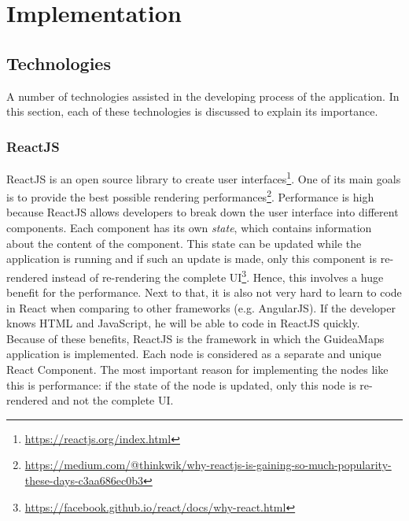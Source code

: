\chapter{Implementation}\label{ch:implementation}

\section{Technologies}\label{sec:technologies}
A number of technologies assisted in the developing process of the application. In this section, each of these technologies is discussed to explain its importance.

\subsection{ReactJS}\label{sec:reactjs}
ReactJS is an open source library to create user interfaces\footnote{\url{https://reactjs.org/index.html}}. One of its main goals is to provide the best possible rendering performances\footnote{\url{https://medium.com/@thinkwik/why-reactjs-is-gaining-so-much-popularity-these-days-c3aa686ec0b3}}. Performance is high because ReactJS allows developers to break down the user interface into different components. Each component has its own \textit{state}, which contains information about the content of the component. This state can be updated while the application is running and if such an update is made, only this component is re-rendered instead of re-rendering the complete UI\footnote{\url{https://facebook.github.io/react/docs/why-react.html}}. Hence, this involves a huge benefit for the performance. Next to that, it is also not very hard to learn to code in React when comparing to other frameworks (e.g. AngularJS). If the developer knows HTML and JavaScript, he will be able to code in ReactJS quickly.\\

Because of these benefits, ReactJS is the framework in which the GuideaMaps application is implemented. Each node is considered as a separate and unique React Component. The most important reason for implementing the nodes like this is performance: if the state of the node is updated, only this node is re-rendered and not the complete UI.

